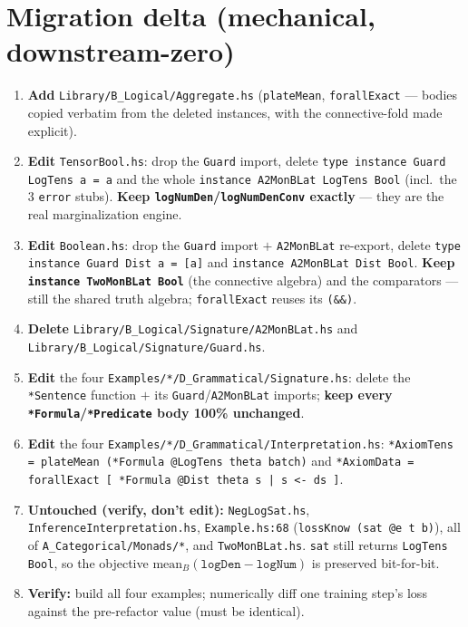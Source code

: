 \documentclass[11pt]{article}
\newcommand{\code}[1]{\texttt{#1}}
\begin{document}
\section*{Migration delta (mechanical, downstream-zero)}

\begin{enumerate}
  \item \textbf{Add} \code{Library/B\_Logical/Aggregate.hs} (\code{plateMean}, \code{forallExact} --- bodies
        copied verbatim from the deleted instances, with the connective-fold made explicit).
  \item \textbf{Edit} \code{TensorBool.hs}: drop the \code{Guard} import, delete
        \code{type instance Guard LogTens a = a} and the whole \code{instance A2MonBLat LogTens Bool} (incl.\
        the 3 \code{error} stubs). \textbf{Keep \code{logNumDen}/\code{logNumDenConv} exactly} --- they are
        the real marginalization engine.
  \item \textbf{Edit} \code{Boolean.hs}: drop the \code{Guard} import $+$ \code{A2MonBLat} re-export, delete
        \code{type instance Guard Dist a = [a]} and \code{instance A2MonBLat Dist Bool}. \textbf{Keep
        \code{instance TwoMonBLat Bool}} (the connective algebra) and the comparators --- still the shared
        truth algebra; \code{forallExact} reuses its \code{(\&\&)}.
  \item \textbf{Delete} \code{Library/B\_Logical/Signature/A2MonBLat.hs} and
        \code{Library/B\_Logical/Signature/Guard.hs}.
  \item \textbf{Edit} the four \code{Examples/*/D\_Grammatical/Signature.hs}: delete the \code{*Sentence}
        function $+$ its \code{Guard}/\code{A2MonBLat} imports; \textbf{keep every
        \code{*Formula}/\code{*Predicate} body 100\% unchanged}.
  \item \textbf{Edit} the four \code{Examples/*/D\_Grammatical/Interpretation.hs}:
        \code{*AxiomTens = plateMean (*Formula @LogTens theta batch)} and
        \code{*AxiomData = forallExact [ *Formula @Dist theta s | s <- ds ]}.
  \item \textbf{Untouched (verify, don't edit):} \code{NegLogSat.hs}, \code{InferenceInterpretation.hs},
        \code{Example.hs:68} (\code{lossKnow (sat @e t b)}), all of \code{A\_Categorical/Monads/*}, and
        \code{TwoMonBLat.hs}. \code{sat} still returns \code{LogTens Bool}, so the objective
        $\mathrm{mean}_{B}(\code{logDen} - \code{logNum})$ is preserved bit-for-bit.
  \item \textbf{Verify:} build all four examples; numerically diff one training step's loss against the
        pre-refactor value (must be identical).
\end{enumerate}
\end{document}
